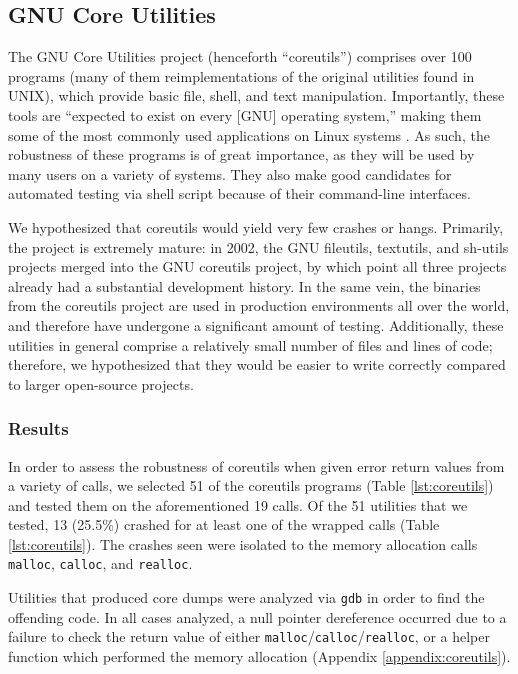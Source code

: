 \subsection{GNU Core Utilities}
The GNU Core Utilities project (henceforth ``coreutils'') comprises over 100 programs (many of them reimplementations of the original utilities found in UNIX), which provide basic file, shell, and text manipulation. Importantly, these tools are ``expected to exist on every [GNU] operating system,'' making them some of the most commonly used applications on Linux systems \cite{coreutils}. As such, the robustness of these programs is of great importance, as they will be used by many users on a variety of systems. They also make good candidates for automated testing via shell script because of their command-line interfaces.

We hypothesized that coreutils would yield very few crashes or hangs. Primarily, the project is extremely mature: in 2002, the GNU fileutils, textutils, and sh-utils projects merged into the GNU coreutils project, by which point all three projects already had a substantial development history. In the same vein, the binaries from the coreutils project are used in production environments all over the world, and therefore have undergone a significant amount of testing. Additionally, these utilities in general comprise a relatively small number of files and lines of code; therefore, we hypothesized that they would be easier to write correctly compared to larger open-source projects.

\subsubsection{Results}
In order to assess the robustness of coreutils when given error return values from a variety of calls, we selected 51 of the coreutils programs (Table \ref{lst:coreutils}) and tested them on the aforementioned 19 calls. Of the 51 utilities that we tested, 13 (25.5\%) crashed for at least one of the wrapped calls (Table \ref{lst:coreutils}). The crashes seen were isolated to the memory allocation calls \texttt{malloc}, \texttt{calloc}, and \texttt{realloc}. 

Utilities that produced core dumps were analyzed via \texttt{gdb} in order to find the offending code. In all cases analyzed, a null pointer dereference occurred due to a failure to check the return value of either \texttt{malloc}/\texttt{calloc}/\texttt{realloc}, or a helper function which performed the memory allocation (Appendix \ref{appendix:coreutils}).

